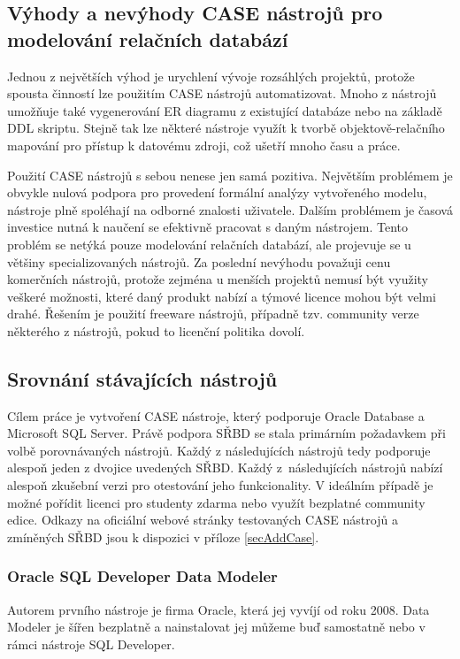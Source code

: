 \documentclass[czech,bachelor,public,dept460,male,oneside]{diploma}
\begin{document}
	\subsection{Výhody a nevýhody CASE nástrojů pro modelování relačních databází}
	Jednou z největších výhod je urychlení vývoje rozsáhlých projektů, protože spousta činností lze použitím CASE nástrojů automatizovat. Mnoho z nástrojů umožňuje také vygenerování ER diagramu z existující databáze nebo na základě DDL skriptu. Stejně tak lze některé nástroje využít k tvorbě objektově-relačního mapování pro přístup k datovému zdroji, což ušetří mnoho času a práce. 
	
	Použití CASE nástrojů s sebou nenese jen samá pozitiva. Největším problémem je obvykle nulová podpora pro provedení formální analýzy vytvořeného modelu, nástroje plně spoléhají na odborné znalosti uživatele. Dalším problémem je časová investice nutná k naučení se efektivně pracovat s daným nástrojem. Tento problém se netýká pouze modelování relačních databází, ale projevuje se u většiny specializovaných nástrojů.	Za poslední nevýhodu považuji cenu komerčních nástrojů, protože zejména u menších projektů nemusí být využity veškeré možnosti, které daný produkt nabízí a týmové licence mohou být velmi drahé. Řešením je použití freeware nástrojů, případně tzv. community verze některého z nástrojů, pokud to licenční politika dovolí.
	
	\subsection{Srovnání stávajících nástrojů}
	Cílem práce je vytvoření CASE nástroje, který podporuje Oracle Database a Microsoft SQL Server. Právě podpora SŘBD se stala primárním požadavkem při volbě porovnávaných nástrojů. Každý z následujících nástrojů tedy podporuje alespoň jeden z dvojice uvedených SŘBD. Každý z~následujících nástrojů nabízí alespoň zkušební verzi pro otestování jeho funkcionality. V ideálním případě je možné pořídit licenci pro studenty zdarma nebo využít bezplatné community edice. Odkazy na oficiální webové stránky testovaných CASE nástrojů a zmíněných SŘBD jsou k dispozici v příloze \ref{secAddCase}. 
	
		\subsubsection{Oracle SQL Developer Data Modeler}
		Autorem prvního nástroje je firma Oracle, která jej vyvíjí od roku 2008. Data Modeler je šířen bezplatně a nainstalovat jej můžeme buď samostatně nebo v rámci nástroje SQL Developer. 
		
\end{document}
